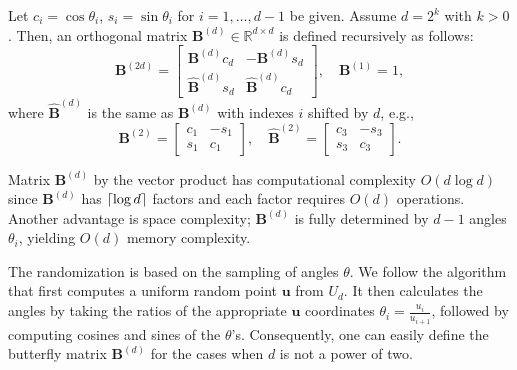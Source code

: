 \begin{definition}
    Let $c_i = \cos\theta_i$, $s_i = \sin\theta_i$ for $i = 1,\dots,d-1$ be given. Assume $d=2^k$ with $k > 0$. Then, an orthogonal matrix $\mathbf{B}^{(d)} \in \mathbb{R}^{d \times d}$ is defined recursively as follows:
    \begin{equation*}
    \mathbf{B}^{(2d)} =
    \begin{bmatrix}
        \mathbf{B}^{(d)}c_d & -\mathbf{B}^{(d)}s_d \\
        \mathbf{\hat{B}}^{(d)}s_d & \mathbf{\hat{B}}^{(d)}c_d
    \end{bmatrix},
    \quad \mathbf{B}^{(1)} = 1,
    \end{equation*}
    where $\mathbf{\hat{B}}^{(d)}$ is the same as $\mathbf{B}^{(d)}$ with indexes $i$ shifted by $d$, e.g.,
    \begin{equation*}
    \mathbf{B}^{(2)} =
    \begin{bmatrix}
        c_1 & -s_1 \\
        s_1 & c_1
    \end{bmatrix},
    \quad
    \mathbf{\hat{B}}^{(2)} =
    \begin{bmatrix}
        c_3 & -s_3 \\
        s_3 & c_3
    \end{bmatrix}.
    \end{equation*}

\end{definition}
Matrix $\mathbf{B}^{(d)}$ by the vector product has computational complexity $O(d\log d)$ since $\mathbf{B}^{(d)}$ has $\lceil\log d\rceil$ factors and each factor requires $O(d)$ operations. Another advantage is space complexity; $\mathbf{B}^{(d)}$ is fully determined by $d-1$ angles $\theta_i$, yielding $O(d)$ memory complexity.

The randomization is based on the sampling of angles $\theta$.
We follow the\citep{fang1997some} algorithm that first computes a uniform random point $\mathbf{u}$ from $U_d$. It then calculates the angles by taking the ratios of the appropriate $\mathbf{u}$ coordinates $\theta_i = \frac{u_i}{u_{i+1}}$, followed by computing cosines and sines of the $\theta$'s.
Consequently, one can easily define the butterfly matrix $\mathbf{B}^{(d)}$ for the cases when $d$ is not a power of two.

